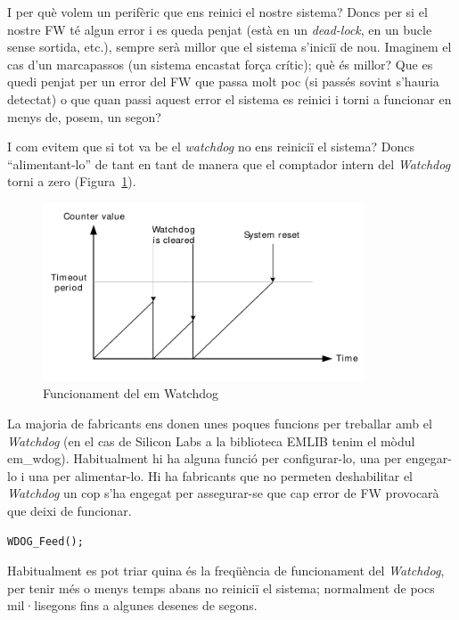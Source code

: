 I per què volem un perifèric que ens reinici el nostre sistema? Doncs per si el nostre \gls{FW} té algun error i es queda penjat (està en un {\em \gls{dead-lock}}, en un bucle sense sortida, etc.), sempre serà millor que el sistema s'iniciï de nou. Imaginem el cas d'un marcapassos (un sistema encastat força crític); què és millor? Que es quedi penjat per un error del \gls{FW} que passa molt poc (si passés sovint s'hauria detectat) o que quan passi aquest error el sistema es reinici i torni a funcionar en menys de, posem, un segon?

I com evitem que si tot va be el {\em watchdog} no ens reiniciï el sistema? Doncs “alimentant-lo” de tant en tant de manera que el comptador intern del {\em Watchdog} torni a zero (Figura~\ref{fig:Watchdog}).

\begin{figure}
 \centering
 \includegraphics[width=0.85\textwidth, keepaspectratio]{imatges/Watchdog.png}
 \caption{Funcionament del {em Watchdog} \cite{EFM_AN0015}}
 \label{fig:Watchdog}
\end{figure}

La majoria de fabricants ens donen unes poques funcions per treballar amb el {\em Watchdog} (en el cas de Silicon Labs a la biblioteca EMLIB tenim el mòdul em\_wdog). Habitualment hi ha alguna funció per configurar-lo, una per engegar-lo i una per alimentar-lo. Hi ha fabricants que no permeten deshabilitar el {\em Watchdog} un cop s'ha engegat per assegurar-se que cap error de \gls{FW} provocarà que deixi de funcionar.
\begin{lstlisting}[style=customc]
WDOG_Feed();
\end{lstlisting}

Habitualment es pot triar quina és la freqüència de funcionament del {\em Watchdog}, per tenir més o menys temps abans no reiniciï el sistema; normalment de pocs mil·lisegons fins a algunes desenes de segons.

